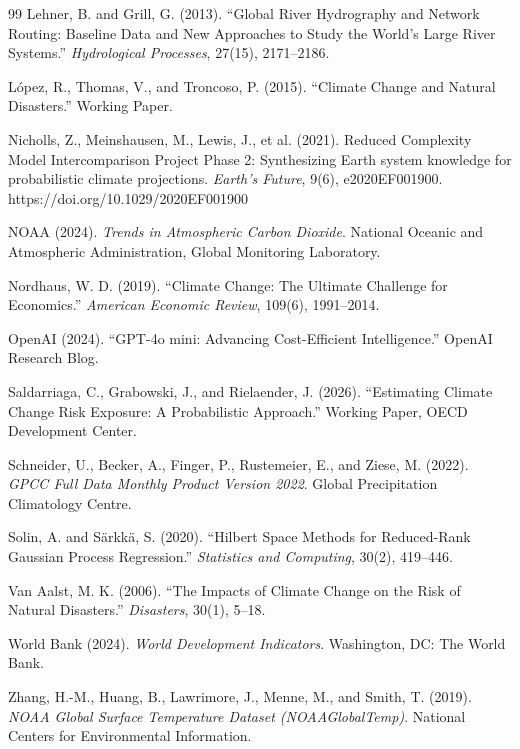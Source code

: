 \documentclass[11pt,a4paper]{article}
\begin{document}
\begin{thebibliography}{99}
Lehner, B. and Grill, G. (2013).
``Global River Hydrography and Network Routing: Baseline Data and New Approaches to Study the World's Large River Systems.''
\textit{Hydrological Processes}, 27(15), 2171--2186.

L\'{o}pez, R., Thomas, V., and Troncoso, P. (2015).
``Climate Change and Natural Disasters.''
Working Paper.

Nicholls, Z., Meinshausen, M., Lewis, J., et al. (2021).
Reduced Complexity Model Intercomparison Project Phase 2: Synthesizing Earth system knowledge for probabilistic climate projections.
\textit{Earth's Future}, 9(6), e2020EF001900.
https://doi.org/10.1029/2020EF001900

NOAA (2024).
\textit{Trends in Atmospheric Carbon Dioxide}.
National Oceanic and Atmospheric Administration, Global Monitoring Laboratory.

Nordhaus, W. D. (2019).
``Climate Change: The Ultimate Challenge for Economics.''
\textit{American Economic Review}, 109(6), 1991--2014.

OpenAI (2024).
``GPT-4o mini: Advancing Cost-Efficient Intelligence.''
OpenAI Research Blog.

Saldarriaga, C., Grabowski, J., and Rielaender, J. (2026).
``Estimating Climate Change Risk Exposure: A Probabilistic Approach.''
Working Paper, OECD Development Center.

Schneider, U., Becker, A., Finger, P., Rustemeier, E., and Ziese, M. (2022).
\textit{GPCC Full Data Monthly Product Version 2022}.
Global Precipitation Climatology Centre.

Solin, A. and S\"{a}rkk\"{a}, S. (2020).
``Hilbert Space Methods for Reduced-Rank Gaussian Process Regression.''
\textit{Statistics and Computing}, 30(2), 419--446.

Van Aalst, M. K. (2006).
``The Impacts of Climate Change on the Risk of Natural Disasters.''
\textit{Disasters}, 30(1), 5--18.

World Bank (2024).
\textit{World Development Indicators}.
Washington, DC: The World Bank.

Zhang, H.-M., Huang, B., Lawrimore, J., Menne, M., and Smith, T. (2019).
\textit{NOAA Global Surface Temperature Dataset (NOAAGlobalTemp)}.
National Centers for Environmental Information.

\end{thebibliography}
\end{document}
